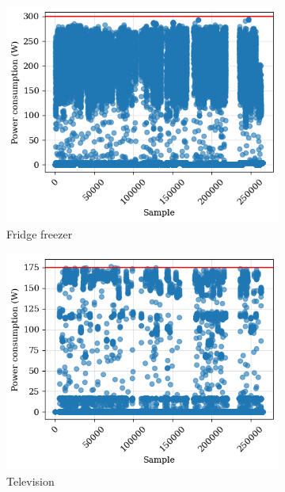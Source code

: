 \begin{figure}
\begin{subfigure}{.5\textwidth}
      \includegraphics[width=.9\linewidth]{images/raw_consumptions/fridge.png}
      \caption{Fridge freezer}
      \label{fig:fridge_freezer}
    \end{subfigure}%
    \begin{subfigure}{.5\textwidth}
      \centering
      \includegraphics[width=.9\linewidth]{images/raw_consumptions/television.png}
      \caption{Television}
      \label{fig:television}
    \end{subfigure}
    \begin{subfigure}{.5\textwidth}
      \centering

\end{subfigure}
\end{figure}
